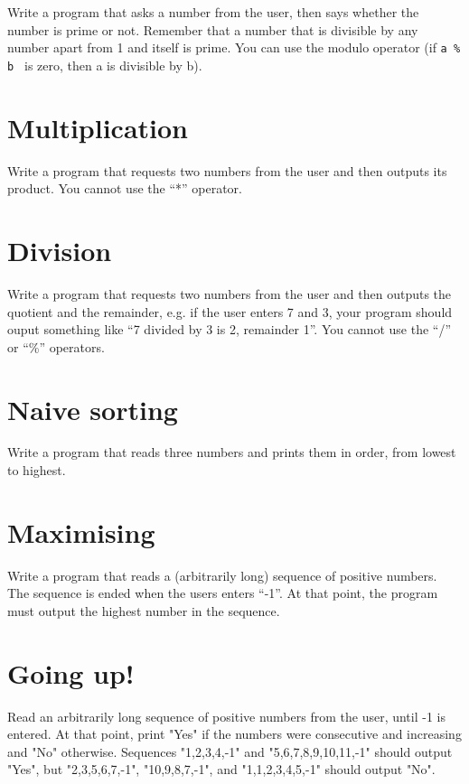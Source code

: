 \documentclass{article}
\begin{document}
Write a program that asks a number from the user, then says whether
the number is prime or not. Remember that a number that is divisible
by any number apart from 1 and itself is prime. You can use the modulo
operator (if \verb+a % b + is zero, then a is divisible by b).

\section{Multiplication}
\label{sec:multiplication}

Write a program that requests two numbers from the user and then
outputs its product. You cannot use the ``*'' operator. 

\section{Division}
\label{sec:division}

Write a program that requests two numbers from the user and then
outputs the quotient and the remainder, e.g. if the user enters 7 and
3, your program should ouput something like ``7 divided by 3 is 2,
remainder 1''. You cannot use the ``/'' or ``\%'' operators. 

\section{Naive sorting}
\label{sec:naive-sorting}

Write a program that reads three numbers and prints them in order, from
lowest to highest. 

\section{Maximising}
\label{sec:maximising}

Write a program that reads a (arbitrarily long) sequence of positive
numbers. The sequence is ended when the users enters ``-1''. At that
point, the program must output the highest number in the sequence. 

\section{Going up!}
\label{sec:going-up}

Read an arbitrarily long sequence of positive numbers from the user,
until -1 is entered. At that point, print "Yes" if the numbers were
consecutive and increasing and "No" otherwise. Sequences "1,2,3,4,-1"
and "5,6,7,8,9,10,11,-1" should output "Yes", but "2,3,5,6,7,-1",
"10,9,8,7,-1", and "1,1,2,3,4,5,-1" should output "No".
\end{document}
